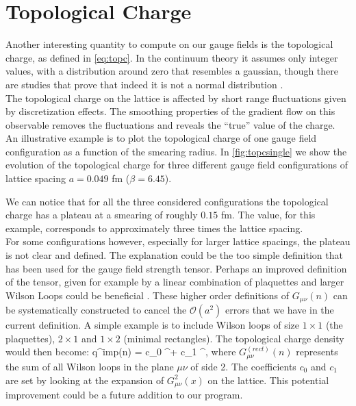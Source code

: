 
\section{Topological Charge}
Another interesting quantity to compute on our gauge fields is the topological charge, as defined in \cref{eq:topc}. In the continuum theory it assumes only integer values, with a distribution around zero that resembles a gaussian, though there are studies that prove that indeed it is not a normal distribution \cite{ce_non-gaussianities_2015}. \\
The topological charge on the lattice is affected by short range fluctuations given by discretization effects. The smoothing properties of the gradient flow on this observable removes the fluctuations and reveals the ``true'' value of the charge. An illustrative example is to plot the topological charge of one gauge field configuration as a function of the smearing radius. In \cref{fig:topcsingle} we show the evolution of the topological charge for three different gauge field configurations of lattice spacing $a=0.049$ fm ($\beta=6.45$). 

We can notice that for all the three considered configurations the topological charge has a plateau at a smearing of roughly $0.15$ fm. The value, for this example, corresponds to approximately three times the lattice spacing.\\ 
For some configurations however, especially for larger lattice spacings, the plateau is not clear and defined. The explanation could be the too simple definition that has been used for the gauge field strength tensor. Perhaps an improved definition of the tensor, given for example by a linear combination of plaquettes and larger Wilson Loops could be beneficial \cite{bilson-thompson_highly-improved_2003,alexandrou_comparison_2017}. These higher order definitions of $G_{\mu\nu}(n)$ can be systematically constructed to cancel the $\mathcal{O}(a^2)$ errors that we have in the current definition. A simple example is to include Wilson loops of size $1\times1$ (the plaquettes),  $2\times1$ and $1\times2$ (minimal rectangles). The topological charge density would then become:
\beq
    q^{imp}(n) =  c_0 \epsilon^{\mu\nu\rho\sigma} + c_1 \epsilon^{\mu\nu\rho\sigma},
\eeq
where $G_{\mu\nu}^{(rect)}(n)$ represents the sum of all Wilson loops in the plane $\mu\nu$ of side 2. The coefficients $c_0$ and $c_1$ are set by looking at the expansion of $G_{\mu\nu}^2(x)$ on the lattice. This potential improvement could be a future addition to our program.

